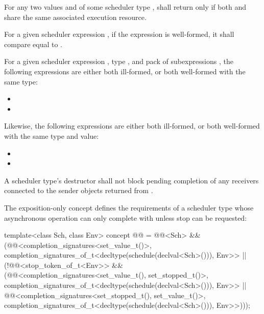 \pnum
For any two values  and 
of some scheduler type ,
 shall return 
only if both  and  share
the same associated execution resource.

\pnum
For a given scheduler expression ,
if the expression
is well-formed,
it shall compare equal to .

\pnum
For a given scheduler expression ,
type , and
pack of subexpressions ,
the following expressions are either both ill-formed, or
both well-formed with the same type:
\begin{itemize}
\item {}
\item {}
\end{itemize}
Likewise, the following expressions are either both ill-formed, or
both well-formed with the same type and value:
\begin{itemize}
\item {}
\item {}
\end{itemize}

\pnum
A scheduler type's destructor shall not block
pending completion of any receivers
connected to the sender objects returned from .

\pnum
The exposition-only  concept
defines the requirements of a scheduler type
whose  asynchronous operation
can only complete with  unless stop can be requested:
\begin{codeblock}
template<class Sch, class Env>
  concept @@ =
    @@<Sch> &&
    (@@<completion_signatures<set_value_t()>,
             completion_signatures_of_t<decltype(schedule(declval<Sch>())), Env>> ||
     (!@@<stop_token_of_t<Env>> &&
      (@@<completion_signatures<set_value_t(), set_stopped_t()>,
               completion_signatures_of_t<decltype(schedule(declval<Sch>())), Env>> ||
       @@<completion_signatures<set_stopped_t(), set_value_t()>,
               completion_signatures_of_t<decltype(schedule(declval<Sch>())), Env>>)));
\end{codeblock}

